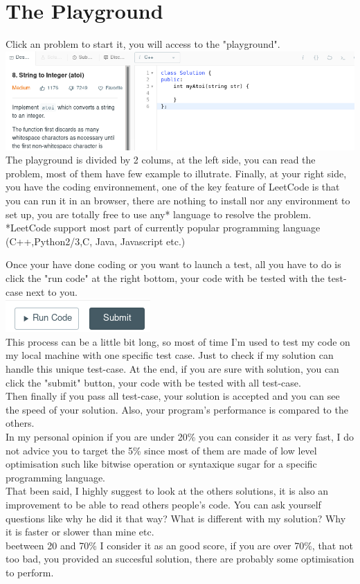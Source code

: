 \documentclass[12pt, letterpaper]{article}
\begin{document}
\section{The Playground}
Click an problem to start it, you will access to the "playground".\\
\includegraphics[width=\linewidth]{img/L7.png}\\

The playground is divided by 2 colums, at the left side, you can read the problem, most of them have few example to illutrate. Finally, at your right side, you have the coding environnement, one of the key feature of LeetCode is that you can run it in an browser, there are nothing to install nor any environment to set up, you are totally free to use any* language to resolve the problem.\\
*LeetCode support most part of currently popular programming language (C++,Python2/3,C, Java, Javascript etc.)

Once your have done coding or you want to launch a test, all you have to do is click the "run code" at the right bottom, your code with be tested with the test-case next to you.\\
\includegraphics{img/L8.png}\\

This process can be a little bit long, so most of time I'm used to test my code on my local machine with one specific test case. Just to check if my solution can handle this unique test-case.
At the end, if you are sure with solution, you can click the "submit" button, your code with be tested with all test-case.\\
Then finally if you pass all test-case, your solution is accepted and you can see the speed of your solution. Also, your program's performance is compared to the others.\\
In my personal opinion if you are under 20\% you can consider it as very fast, I do not advice you to target the 5\% since most of them are made of low level optimisation such like bitwise operation or syntaxique sugar for a specific programming language.\\
That been said, I highly suggest to look at the others solutions, it is also an improvement to be able to read others people's code. You can ask yourself questions like why he did it that way? What is different with my solution? Why it is faster or slower than mine etc.\\
beetween 20 and 70\% I consider it as an good score, if you are over 70\%, that not too bad, you provided an succesful solution, there are probably some optimisation to perform.\\
\end{document}
